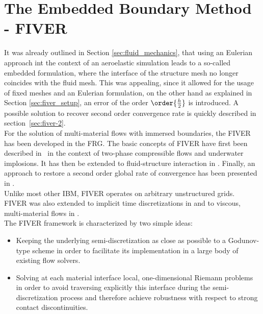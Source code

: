 \documentclass[../main.tex]{subfiles}
\begin{document}
\setlength{\delimitershortfall}{0pt}
\section{The Embedded Boundary Method - FIVER}\label{sec:embedded_boundary_method}

It was already outlined in Section \ref{sec:fluid_mechanics}, that using an Eulerian approach int the context of an aeroelastic simulation leads to a so-called embedded formulation, where the interface of the structure mesh no longer coincides with the fluid mesh. This was appealing, since it allowed for the usage of fixed meshes and an Eulerian formulation, on the other hand as  explained in Section \ref{sec:fiver_setup}, an error of the order $\order{\frac{h}{2}}$ is introduced. A possible solution to recover second order convergence rate is quickly described in section~\ref{sec:fiver-2}.\\
For the solution of multi-material flows with immersed boundaries, the \acf{FIVER} has been developed in the \acf{FRG}. The basic concepts of \ac{FIVER} have first been described in~\cite{Farhat2008} in the context of two-phase compressible flows and underwater implosions. It has then be extended to fluid-structure interaction in \cite{Wang2011a}. Finally, an approach to restore a second order global rate of convergence has been presented in \cite{Main2014}.\\
Unlike most other \ac{IBM}, \ac{FIVER} operates on arbitrary unstructured grids.\\
\ac{FIVER} was also extended to implicit time discretizations in \cite{Main2014a} and to viscous, multi-material flows in \cite{Farhat2014}.\\
The \ac{FIVER} framework is characterized by two simple ideas:
\begin{itemize}
\item Keeping the underlying semi-discretization as close as possible to a Godunov-type scheme in order to facilitate its implementation in a large body of existing flow solvers.
\item Solving at each material interface local, one-dimensional Riemann problems in order to avoid traversing explicitly this interface during the semi-discretization process and therefore achieve robustness with respect to strong contact discontinuities.
\end{itemize}
\end{document}
